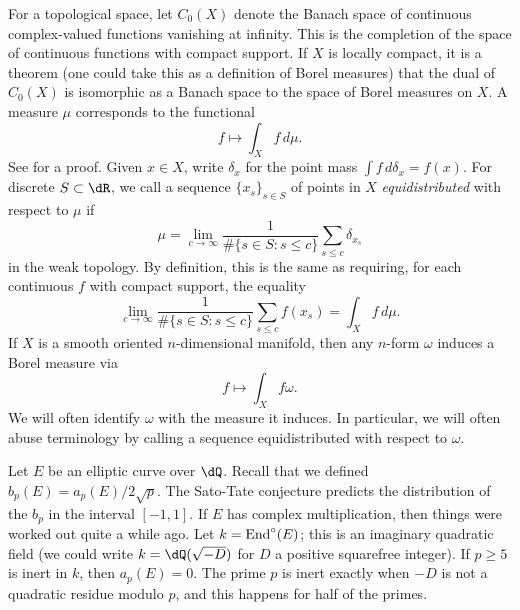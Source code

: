 For a topological space, let $C_0(X)$ denote the Banach space of continuous 
complex-valued functions vanishing at infinity. This is the completion of the 
space of continuous functions with compact support. If $X$ is locally compact, 
it is a theorem (one could take this as a definition of Borel measures) that 
the dual of $C_0(X)$ is isomorphic as a Banach space to the space of Borel 
measures on $X$. A measure $\mu$ corresponds to the functional 
\[
  f\mapsto  \int_X f\, d\mu \text{.}
\]
See \cite[6.19]{ru87} for a proof. Given $x\in X$, write $\delta_x$ for the 
point mass $\int f\,d\delta_x = f(x)$. For discrete $S\subset \dR$, we call a 
sequence $\{x_s\}_{s\in S}$ of points in $X$ \emph{equidistributed} with 
respect to $\mu$ if 
\[
  \mu = \lim_{c \to \infty} \frac{1}{\# \{s\in S:s\leqslant c\}} \sum_{s\leqslant c} \delta_{x_s} 
\]
in the weak topology. By definition, this is the same as requiring, for each 
continuous $f$ with compact support, the equality 
\[
   \lim_{c \to \infty} \frac{1}{\# \{s\in S:s\leqslant c\}} \sum_{s\leqslant c} f(x_s)  = \int_X f\, d\mu\text{.}
\]
If $X$ is a smooth oriented $n$-dimensional manifold, then any $n$-form 
$\omega$ induces a Borel measure via 
\[
  f\mapsto \int_X f\omega \text{.}
\]
We will often identify $\omega$ with the measure it induces. In particular, we 
will often abuse terminology by calling a sequence equidistributed with 
respect to $\omega$. 

Let $E$ be an elliptic curve over $\dQ$. Recall that we defined 
$b_p(E) = a_p(E) / 2\sqrt p$. The Sato-Tate conjecture predicts the 
distribution of the $b_p$ in the interval $[-1,1]$. If $E$ has complex 
multiplication, then things were worked out quite a while ago. Let 
$k=\operatorname{End}^\circ(E)$; this is an imaginary quadratic field (we could write 
$k=\dQ(\sqrt{-D})$ for $D$ a positive squarefree integer). If 
$p\geqslant 5$ is inert in $k$, then $a_p(E) = 0$. The prime $p$ is inert 
exactly when $-D$ is not a quadratic residue modulo $p$, and this happens 
for half of the primes. 

